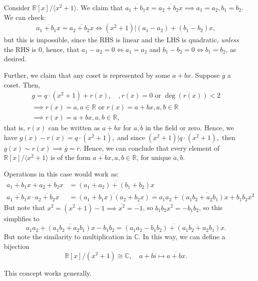 \documentclass[12pt,oneside]{article}
\begin{document}
\begin{example}
  Consider $\mathbb{R}[x]/\langle x^2 + 1\rangle$. We claim that $\overline{a_1 + b_1 x} = \overline{a_2 + b_2 x} \implies a_1 = a_2, b_1 = b_2$. We can check:
  \begin{align*}
    \overline{a_1 + b_1 x} = \overline{a_2 + b_2 x} \iff (x^2 + 1) | (a_1 - a_2) + (b_1 - b_2)x,
  \end{align*}
  but this is impossible, since the RHS is linear and the LHS is quadratic, \emph{unless} the RHS is $0$, hence, that $a_1 - a_2 = 0 \iff a_1 = a_2$ and $b_1 - b_2 = 0 \iff b_1 = b_2$, as desired.

  Further, we claim that any coset is represented by some $a+bx$. Suppose $\overline{g}$ a coset. Then,
  \begin{align*}
    g = q \cdot (x^2 + 1) + r(x), \quad, r(x) = 0 \text{ or } \deg (r(x)) < 2\\
    \implies r(x) = a, a \in \mathbb{R} \text{ or } r(x) = a + bx, a, b \in \mathbb{R}\\
    \implies r(x) = a+bx, a, b \in \mathbb{R},
  \end{align*}
  that is, $r(x)$ can be written as $a +bx$ for $a,b$ in the field or zero. Hence, we have $g(x) - r(x) = q \cdot (x^2 +1),$ and since $(x^2 + 1 )| q \cdot (x^2 + 1),$ then $g(x) \sim r(x) \implies \overline{g} = \overline{r}$. Hence, we can conclude that every element of $\mathbb{R}[x]/\langle x^2 + 1 \rangle$ is of the form $\overline{a + bx}, a, b \in \mathbb{R}$, for unique $a,b$.

  Operations in this case would work as:
  \begin{align*}
    \overline{a_1 + b_1 x} + \overline{a_2 + b_2 x} &= \overline{(a_1 + a_2) + (b_1 + b_2)x}\\
    \overline{a_1 + b_1 x} \cdot \overline{a_2 + b_2 x} &= \overline{(a_1 + b_1x)(a_2 + b_2 x)} = \overline{a_1a_2 + (a_1 b_2 + a_2 b_1)x + b_1 b_2 x^2}
  \end{align*}
  But note that $x^2 = (x^2+1)-1 \implies \overline{x^2} = \overline{-1}$, so $b_1 b_2 x^2 = - b_1 b_2$, so this simplifies to \[
    \overline{a_1a_2 + (a_1 b_2 + a_2 b_1)x - b_1b_2} = \overline{(a_1a_2- b_1b_2) + (a_1 b_2 + a_2 b_1)x }.
  \]
  But note the similarity to multiplication in $\mathbb{C}$. In this way, we can define a bijection\footnotemark \[\mathbb{R}[x]/(x^2+1) \cong \mathbb{C}, \quad a + bi \mapsto \overline{a+bx}.\]
\end{example}
\begin{remark}
  This concept works generally. %
\end{remark}
\end{document}
